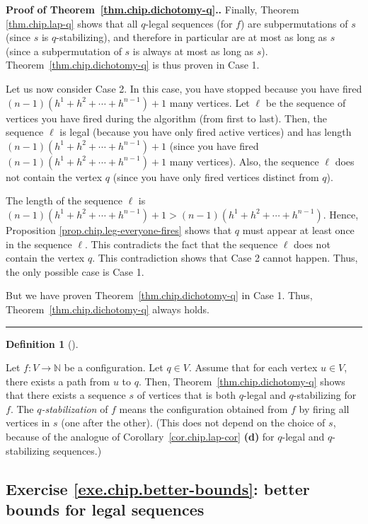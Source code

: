 \documentclass[numbers=enddot,12pt,final,onecolumn,notitlepage]{scrartcl}%
\theoremstyle{definition}
\newtheorem{defi}[theo]{Definition}
\newenvironment{definition}[1][]
{\begin{defi}[#1]\begin{leftbar}}
{\end{leftbar}\end{defi}}
\newenvironment{proof}[1][Proof]{\noindent\textbf{#1.} }{\ \rule{0.5em}{0.5em}}
\newcommand{\NN}{\mathbb{N}}
\begin{document}
\begin{proof}[Proof of Theorem~\ref{thm.chip.dichotomy-q}.]
Finally, Theorem \ref{thm.chip.lap-q} shows that all $q$-legal sequences (for
$f$) are subpermutations of $s$ (since $s$ is $q$-stabilizing), and therefore
in particular are at most as long as $s$ (since a subpermutation of $s$ is
always at most as long as $s$). Theorem~\ref{thm.chip.dichotomy-q} is thus
proven in Case 1.

Let us now consider Case 2. In this case, you have stopped because you have
fired $\left(  n-1\right)  \left(  h^{1}+h^{2}+\cdots+h^{n-1}\right) +1 $ many
vertices. Let $\ell$ be the sequence of vertices you have fired during the
algorithm (from first to last). Then, the sequence $\ell$ is legal (because
you have only fired active vertices) and has length $\left(  n-1\right)
\left(  h^{1}+h^{2}+\cdots+h^{n-1}\right) +1 $ (since you have fired $\left(
n-1\right)  \left(  h^{1}+h^{2}+\cdots+h^{n-1}\right) +1 $ many vertices).
Also, the sequence $\ell$ does not contain the vertex $q$ (since you have only
fired vertices distinct from $q$).

The length of the sequence $\ell$ is \newline
$\left(  n-1\right)  \left(  h^{1}%
+h^{2}+\cdots+h^{n-1}\right)  +1>\left(  n-1\right)  \left(  h^{1}%
+h^{2}+\cdots+h^{n-1}\right)  $. Hence, Proposition
\ref{prop.chip.leg-everyone-fires} shows that $q$ must appear at least once in
the sequence $\ell$. This contradicts the fact that the sequence $\ell$ does
not contain the vertex $q$. This contradiction shows that Case 2 cannot
happen. Thus, the only possible case is Case 1.

But we have proven Theorem~\ref{thm.chip.dichotomy-q} in Case 1. Thus,
Theorem~\ref{thm.chip.dichotomy-q} always holds.
\end{proof}

\begin{definition}
Let $f : V \to \NN$ be a configuration.
Let $q \in V$.
Assume that for each vertex $u \in V$, there exists a path
from $u$ to $q$.
Then, Theorem~\ref{thm.chip.dichotomy-q} shows that
there exists a sequence $s$ of vertices that is both
$q$-legal and $q$-stabilizing for $f$.
The \textit{$q$-stabilization} of $f$ means
the configuration obtained from $f$ by firing
all vertices in $s$ (one after the other).
(This does not depend on the choice of $s$, because of
the analogue of
Corollary~\ref{cor.chip.lap-cor} \textbf{(d)}
for $q$-legal and $q$-stabilizing sequences.)
\end{definition}


\subsection{Exercise \ref{exe.chip.better-bounds}: better
bounds for legal sequences}
\end{document}
